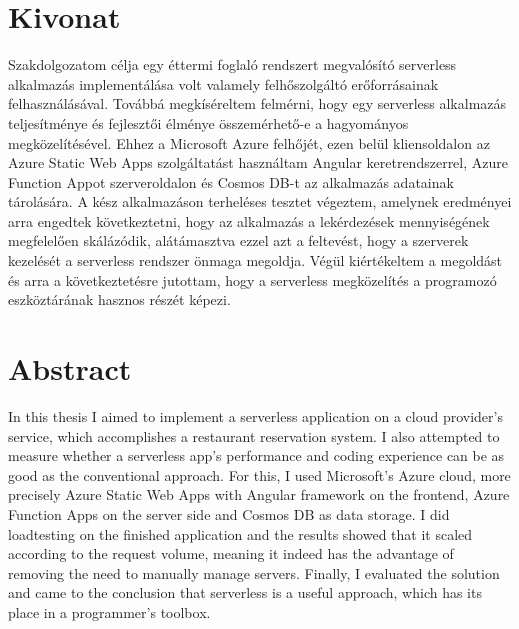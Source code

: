 \chapter*{Kivonat}

Szakdolgozatom célja egy éttermi foglaló rendszert megvalósító serverless alkalmazás implementálása volt valamely felhőszolgáltó erőforrásainak felhasználásával. Továbbá megkíséreltem felmérni, hogy egy serverless alkalmazás teljesítménye és fejlesztői élménye összemérhető-e a hagyományos megközelítésével. Ehhez a Microsoft Azure felhőjét, ezen belül kliensoldalon az Azure Static Web Apps szolgáltatást használtam Angular keretrendszerrel, Azure Function Appot szerveroldalon és Cosmos DB-t az alkalmazás adatainak tárolására. A kész alkalmazáson terheléses tesztet végeztem, amelynek eredményei arra engedtek következtetni, hogy az alkalmazás a lekérdezések mennyiségének megfelelően skálázódik, alátámasztva ezzel azt a feltevést, hogy a szerverek kezelését a serverless rendszer önmaga megoldja.
Végül kiértékeltem a megoldást és arra a következtetésre jutottam, hogy a serverless megközelítés a programozó eszköztárának hasznos részét képezi. 
\vfill

\chapter*{Abstract}

In this thesis I aimed to implement a serverless application on a cloud provider's service, which accomplishes a restaurant reservation system. I also attempted to measure whether a serverless app's performance and coding experience can be as good as the conventional approach. 
For this, I used Microsoft's Azure cloud, more precisely Azure Static Web Apps with Angular framework on the frontend, Azure Function Apps on the server side and Cosmos DB as data storage.
I did loadtesting on the finished application and the results showed that it scaled according to the request volume, meaning it indeed has the advantage of removing the need to manually manage servers.
Finally, I evaluated the solution and came to the conclusion that serverless is a useful approach, which has its place in a programmer's toolbox.
\vfill

